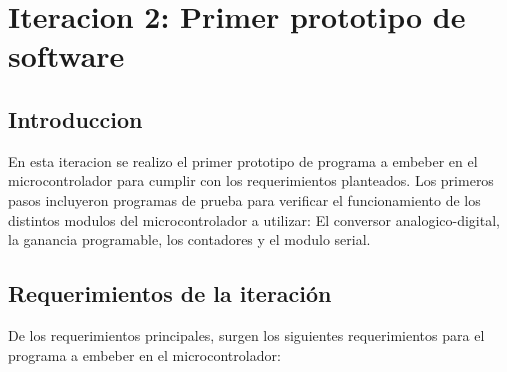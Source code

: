 \chapter{Iteracion 2: Primer prototipo de software} %
\label{cha:iteracion_2}

\section{Introduccion} %
\label{sec:introduccion}


En esta iteracion se realizo el primer prototipo de programa a embeber en el microcontrolador para cumplir con los requerimientos planteados. Los primeros pasos incluyeron programas de prueba para verificar el funcionamiento de los distintos modulos del microcontrolador a utilizar: El conversor analogico-digital, la ganancia programable, los contadores y el modulo serial. 


\section{Requerimientos de la iteración} %
\label{sec:requerimientos_de_la_iteracion}

De los requerimientos principales, surgen los siguientes requerimientos para el programa a embeber en el microcontrolador:

